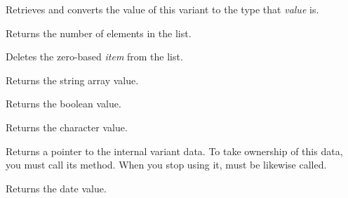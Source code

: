 


Retrieves and converts the value of this variant to the type that {\it value} is.


\label{wxvariantgetcount}


Returns the number of elements in the list.

\label{wxvariantdelete}


Deletes the zero-based {\it item} from the list.

\label{wxvariantgetarraystring}


Returns the string array value.

\label{wxvariantgetbool}


Returns the boolean value.

\label{wxvariantgetchar}


Returns the character value.

\label{wxvariantgetdata}


Returns a pointer to the internal variant data. To take ownership
of this data, you must call its 
method. When you stop using it, 
must be likewise called.

\label{wxvariantgetdatetime}


Returns the date value.

\label{wxvariantgetdouble}



